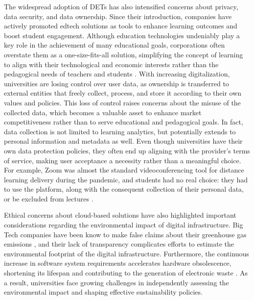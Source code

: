 The widespread adoption of DETs has also intensified concerns about privacy, data security, and data ownership. Since their introduction, companies have actively promoted edtech solutions as tools to enhance learning outcomes and boost student engagement. Although education technologies undeniably play a key role in the achievement of many educational goals, corporations often overstate them as a one-size-fits-all solution, simplifying the concept of learning to align with their technological and economic interests rather than the pedagogical needs of teachers and students \cite{teras_post-covid-19_2020}. With increasing digitalization, universities are losing control over user data, as ownership is transferred to external entities that freely collect, process, and store it according to their own values and policies. This loss of control raises concerns about the misuse of the collected data, which becomes a valuable asset to enhance market competitiveness rather than to serve educational and pedagogical goals. In fact, data collection is not limited to learning analytics, but potentially extends to personal information and metadata as well. Even though universities have their own data protection policies, they often end up aligning with the provider’s terms of service, making user acceptance a necessity rather than a meaningful choice. For example, Zoom was almost the standard videoconferencing tool for distance learning delivery during the pandemic, and students had no real choice: they had to use the platform, along with the consequent collection of their personal data, or be excluded from lectures \cite{fiebig_heads_2023}.

Ethical concerns about cloud-based solutions have also highlighted important considerations regarding the environmental impact of digital infrastructure. Big Tech companies have been know to make false claims about their greenhouse gas emissions \cite{obrien_data_2024}, and their lack of transparency complicates efforts to estimate the environmental footprint of the digital infrastructure. Furthermore, the continuous increase in software system requirements accelerates hardware obsolescence, shortening its lifespan and contributing to the generation of electronic waste \cite{angeli_conceptualising_2022}. As a result, universities face growing challenges in independently assessing the environmental impact and shaping effective sustainability policies.


